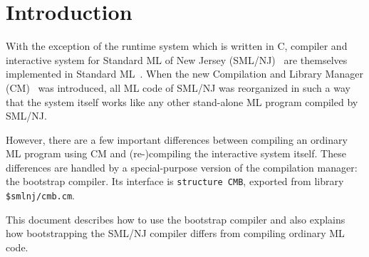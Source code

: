 %

\section{Introduction}

With the exception of the runtime system which is written in C,
compiler and interactive system for Standard ML of New Jersey
(SML/NJ)~\cite{appel91:sml} are themselves implemented in Standard
ML~\cite{milner97}.  When the new Compilation and Library Manager
(CM)~\cite{blume00:newcm} was introduced, all ML code of SML/NJ was
reorganized in such a way that the system itself works like any other
stand-alone ML program compiled by SML/NJ.

However, there are a few important differences between compiling an
ordinary ML program using CM and (re-)compiling the interactive system
itself.  These differences are handled by a special-purpose version of
the compilation manager: the bootstrap compiler.  Its interface is
{\tt structure CMB}, exported from library {\tt \$smlnj/cmb.cm}.

This document describes how to use the bootstrap compiler and also
explains how bootstrapping the SML/NJ compiler differs from compiling
ordinary ML code.
